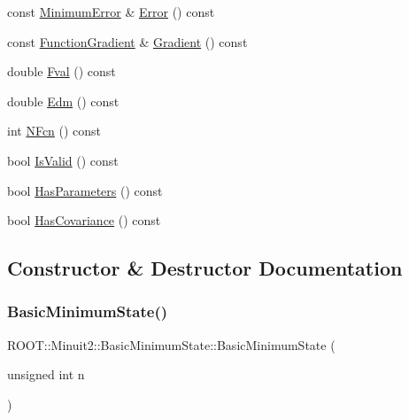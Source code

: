 \begin{DoxyCompactItemize}
const \mbox{\hyperlink{classROOT_1_1Minuit2_1_1MinimumError}{Minimum\+Error}} \& \mbox{\hyperlink{classROOT_1_1Minuit2_1_1BasicMinimumState_a67a7536f33473e23c3461e0c7029e5c5}{Error}} () const
\item 
const \mbox{\hyperlink{classROOT_1_1Minuit2_1_1FunctionGradient}{Function\+Gradient}} \& \mbox{\hyperlink{classROOT_1_1Minuit2_1_1BasicMinimumState_a45b6c728054b409349fb2f6f725a8ab6}{Gradient}} () const
\item 
double \mbox{\hyperlink{classROOT_1_1Minuit2_1_1BasicMinimumState_a5151d99e7c6cd7f3b070ad2c62222010}{Fval}} () const
\item 
double \mbox{\hyperlink{classROOT_1_1Minuit2_1_1BasicMinimumState_a20ae93898c8b726d9e36c40160d23fa9}{Edm}} () const
\item 
int \mbox{\hyperlink{classROOT_1_1Minuit2_1_1BasicMinimumState_ac4566e929ac5ec9fe2dba914bb21207b}{N\+Fcn}} () const
\item 
bool \mbox{\hyperlink{classROOT_1_1Minuit2_1_1BasicMinimumState_af92e32efe08fa047bc433db6f058d11a}{Is\+Valid}} () const
\item 
bool \mbox{\hyperlink{classROOT_1_1Minuit2_1_1BasicMinimumState_a1af83c0464c727dc173834c1612f5e49}{Has\+Parameters}} () const
\item 
bool \mbox{\hyperlink{classROOT_1_1Minuit2_1_1BasicMinimumState_a9d43155058c576759d062561d77b3e1d}{Has\+Covariance}} () const
\end{DoxyCompactItemize}


\subsection{Constructor \& Destructor Documentation}
\mbox{\label{classROOT_1_1Minuit2_1_1BasicMinimumState_a5442cd6f54e10c1a7e888d013393fbf6}} 
\subsubsection{\texorpdfstring{BasicMinimumState()}{BasicMinimumState()}\hspace{0.1cm}{\footnotesize\ttfamily [1/8]}}
{\footnotesize\ttfamily R\+O\+O\+T\+::\+Minuit2\+::\+Basic\+Minimum\+State\+::\+Basic\+Minimum\+State (\begin{DoxyParamCaption}\item[{unsigned int}]{n }\end{DoxyParamCaption})\hspace{0.3cm}{\ttfamily [inline]}}

